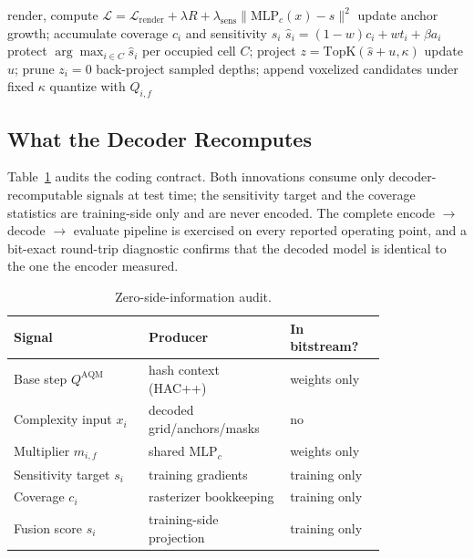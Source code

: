 \documentclass[conference]{IEEEtran}
\newcommand{\DCCA}{DCCA-GS}
\begin{document}
\begin{algorithm}[t]
\caption{\DCCA{} training loop (per iteration)}
\label{alg:loop}
\begin{algorithmic}[1]
\STATE render, compute $\mathcal{L}=\mathcal{L}_{\mathrm{render}}+\lambda R + \lambda_{\mathrm{sens}}\lVert \mathrm{MLP}_c(x)-s\rVert^2$ 
\STATE update anchor growth; accumulate coverage $c_i$ and sensitivity $s_i$
  \STATE $\hat{s}_i=(1-w)c_i + w t_i + \beta a_i$ 
  \STATE protect $\arg\max_{i\in C}\hat{s}_i$ per occupied cell $C$; project $z=\mathrm{TopK}(\hat{s}+u,\kappa)$ 
  \STATE update $u$; prune $z_i=0$
\ENDIF
{}
  \STATE back-project sampled depths; append voxelized candidates under fixed $\kappa$
\ENDIF
\STATE quantize with $Q_{i,f}$ 
\end{algorithmic}
\end{algorithm}

\subsection{What the Decoder Recomputes}
Table~\ref{tab:contract} audits the coding contract. Both innovations consume only
decoder-recomputable signals at test time; the sensitivity target and the coverage
statistics are training-side only and are never encoded. The complete encode
$\to$ decode $\to$ evaluate pipeline is exercised on every reported operating
point, and a bit-exact round-trip diagnostic confirms that the decoded model is
identical to the one the encoder measured.

\begin{table}[t]
\centering
\caption{Zero-side-information audit.}
\label{tab:contract}
\begin{tabular}{p{0.31\linewidth}p{0.28\linewidth}p{0.22\linewidth}}
\toprule
Signal & Producer & In bitstream? \\
\midrule
Base step $Q^{\mathrm{AQM}}$ & hash context (HAC++) & weights only \\
Complexity input $x_i$ & decoded grid/anchors/masks & no \\
Multiplier $m_{i,f}$ & shared $\mathrm{MLP}_c$ & weights only \\
Sensitivity target $s_i$ & training gradients & training only \\
Coverage $c_i$ & rasterizer bookkeeping & training only \\
Fusion score $\hat{s}_i$ & training-side projection & training only \\
\bottomrule
\end{tabular}
\end{table}
\end{document}
